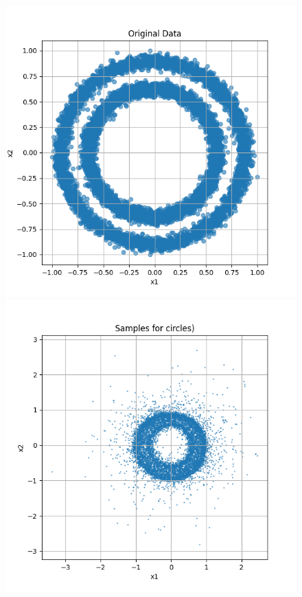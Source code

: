 \documentclass[a4paper,12pt]{article}
\begin{document}
\begin{figure}[h]
  \centering
  \begin{minipage}{0.3\textwidth}
      \centering
      \includegraphics[width=\linewidth]{images/circles.png}
  \end{minipage}
  \begin{minipage}{0.3\textwidth}
      \centering
      \includegraphics[width=\linewidth]{"images/Samples for ddpm_2_10_0.0001_0.02_circles.png"}

\end{minipage}
\end{figure}
\end{document}
